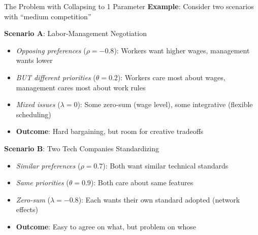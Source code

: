 \documentclass{beamer}
\begin{document}
\begin{frame}{The Problem with Collapsing to 1 Parameter}
\textbf{Example}: Consider two scenarios with ``medium competition''

\vspace{0.3cm}

\textbf{Scenario A}: Labor-Management Negotiation
\begin{itemize}
    \item \textit{Opposing preferences} ($\rho = -0.8$): Workers want higher wages, management wants lower
    \item \textit{BUT different priorities} ($\theta = 0.2$): Workers care most about wages, management cares most about work rules
    \item \textit{Mixed issues} ($\lambda = 0$): Some zero-sum (wage level), some integrative (flexible scheduling)
    \item \textbf{Outcome}: Hard bargaining, but room for creative tradeoffs
\end{itemize}

\vspace{0.3cm}

\textbf{Scenario B}: Two Tech Companies Standardizing
\begin{itemize}
    \item \textit{Similar preferences} ($\rho = 0.7$): Both want similar technical standards
    \item \textit{Same priorities} ($\theta = 0.9$): Both care about same features
    \item \textit{Zero-sum} ($\lambda = -0.8$): Each wants their own standard adopted (network effects)
    \item \textbf{Outcome}: Easy to agree on what, but problem on whose
\end{itemize}

\end{frame}
\end{document}
